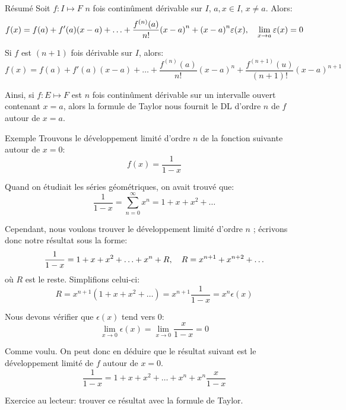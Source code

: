 \documentclass[a4paper]{article}
\begin{document}
\begin{parag}{Résumé}
    Soit $f : I \mapsto F$ $n$ fois continûment dérivable sur $I$, $a, x \in I$, $x \neq a$. Alors:
    \[f\left(x\right) = f\left(a\right) + f'\left(a\right)\left(x-a\right) + \ldots + \frac{f^{\left(n\right)} \left(a\right)}{n!} \left(x - a\right)^n + \left(x-a\right)^n \epsilon\left(x\right), \mathspace \lim_{x \to a} \epsilon\left(x\right) = 0\]

    Si $f$ est $\left(n+1\right)$ fois dérivable sur $I$, alors:
    \[f\left(x\right) = f\left(a\right) + f'\left(a\right)\left(x-a\right) + \ldots + \frac{f^{\left(n\right)} \left(a\right)}{n!} \left(x - a\right)^n + \frac{f^{\left(n+1\right)} \left(u\right)}{\left(n+1\right)!} \left(x - a\right)^{n+1}\]

    Ainsi, si $f : E \mapsto F$ est $n$ fois continûment dérivable sur un intervalle ouvert contenant $x = a$, alors la formule de Taylor nous fournit le DL d'ordre $n$ de $f$ autour de $x = a$.
\end{parag}

\begin{parag}{Exemple}
    Trouvons le développement limité d'ordre $n$ de la fonction suivante autour de $x = 0$:
    \[f\left(x\right) = \frac{1}{1 - x}\]

    Quand on étudiait les séries géométriques, on avait trouvé que:
    \[\frac{1}{1 - x} = \sum_{n=0}^{\infty} x^{n} = 1 + x + x^2 + \ldots\]

    Cependant, nous voulons trouver le développement limité d'ordre $n$ ; écrivons donc notre résultat sous la forme:
    \[\frac{1}{1-x} = 1 + x + x^2 + \ldots + x^{n} + R, \quad R = x^{n+1} + x^{n+2} + \ldots\]
    où $R$ est le reste. Simplifions celui-ci:
    \[R = x^{n+1}\left(1 + x + x^2 + \ldots\right) = x^{n+1} \frac{1}{1 - x} = x^{n} \epsilon\left(x\right) \]

    Nous devons vérifier que $\epsilon\left(x\right)$ tend vers 0:
    \[\lim_{x \to 0} \epsilon\left(x\right) = \lim_{x \to 0} \frac{x}{1-x} = 0\]

    Comme voulu. On peut donc en déduire que le résultat suivant est le développement limité de $f$ autour de $x = 0$.
    \[\frac{1}{1 - x} = 1 + x + x^2 + \ldots + x^{n} + x^{n} \frac{x}{1 - x}\]

    Exercice au lecteur: trouver ce résultat avec la formule de Taylor.
\end{parag}
\end{document}
